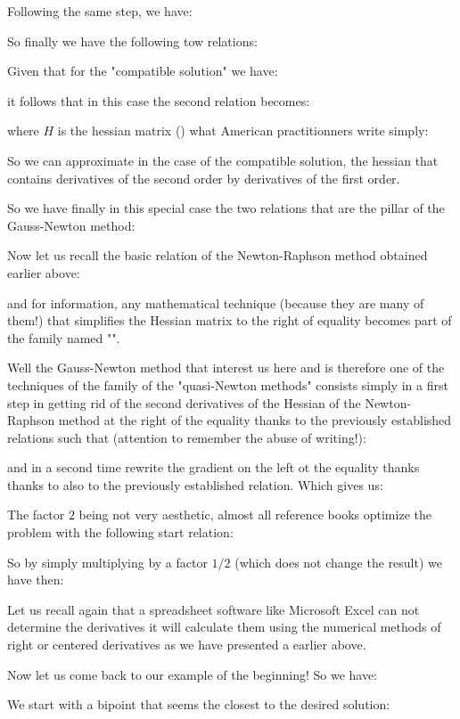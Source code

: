 	Following the same step, we have:
	
	So finally we have the following tow relations:
	
	Given that for the "compatible solution" we have:
	
	it follows that in this case the second relation becomes:
	
	where $H$ is the hessian matrix () what American practitionners write simply:
	
	So we can approximate in the case of the compatible solution, the hessian that contains derivatives of the second order by derivatives of the first order.

	So we have finally in this special case the two relations that are the pillar of the Gauss-Newton method:
	
	Now let us recall the basic relation of the Newton-Raphson method obtained earlier above:
	
	and for information, any mathematical technique (because they are many of them!) that simplifies the Hessian matrix to the right of equality becomes part of the family named "".
	
	Well the Gauss-Newton method that interest us here and is therefore one of the techniques of the family of the "quasi-Newton methods" consists simply in a first step in getting rid of the second derivatives of the Hessian of the Newton-Raphson method at the right of the equality thanks to the previously established relations such that (attention to remember the abuse of writing!):
	
	and in a second time rewrite the gradient on the left ot the equality thanks thanks to also to the previously established relation. Which gives us:
	
	The factor $2$ being not very aesthetic, almost all reference books optimize the problem with the following start relation:
	
	So by simply multiplying by a factor $1/2$ (which does not change the result) we have then:
		
	Let us recall again that a spreadsheet software like Microsoft Excel can not determine the derivatives it will calculate them using the numerical methods of right or centered derivatives as we have presented a earlier above.

	Now let us come back to our example of the beginning! So we have:
	
	We start with a bipoint that seems the closest to the desired solution:
	
